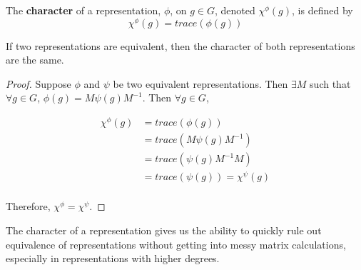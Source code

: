 \begin{definition}
	The \textbf{character} of a representation, $\phi$, on $g \in G$, denoted $\chi^{\phi}(g)$, is defined by $$\chi^{\phi}(g)=trace(\phi(g))$$
\end{definition}

\begin{theorem}
	If two representations are equivalent, then the character of both representations are the same.
\end{theorem}

\begin{proof}Suppose $\phi$ and $\psi$ be two equivalent representations. Then $\exists M$ such that $\forall g \in G$, $\phi(g) = M\psi(g)M^{-1}$. Then $\forall g \in G$,

\begin{equation}
	\begin{aligned}
		\chi^{\phi}(g) &= trace(\phi(g)) \\
						&= trace(M\psi(g)M^{-1}) \\
						&= trace(\psi(g)M^{-1}M) \\
						&= trace(\psi(g)) = \chi^{\psi}(g) \\
	\end{aligned}
\end{equation}

Therefore, $\chi^{\phi} = \chi^{\psi}$. \end{proof}

The character of a representation gives us the ability to quickly rule out equivalence of representations without getting into messy matrix calculations, especially in representations with higher degrees.

